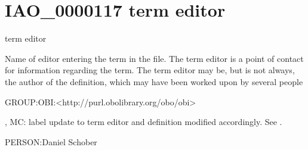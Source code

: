 \documentclass[letterpaper,10pt,english]{sphinxmanual}
\begin{document}
\section{IAO\_0000117 \sphinxhyphen{} term editor}
\label{\detokenize{doc-IAO_0000117:iao-0000117-term-editor}}\label{\detokenize{doc-IAO_0000117:index-0}}\label{\detokenize{doc-IAO_0000117::doc}}
\begin{sphinxShadowBox}

\sphinxAtStartPar
term editor
\end{sphinxShadowBox}

\begin{sphinxShadowBox}

\sphinxAtStartPar
Name of editor entering the term in the file. The term editor is a point of contact for information regarding the term. The term editor may be, but is not always, the author of the definition, which may have been worked upon by several people
\end{sphinxShadowBox}

\begin{sphinxShadowBox}

\sphinxAtStartPar
GROUP:OBI:\textless{}http://purl.obolibrary.org/obo/obi\textgreater{}
\end{sphinxShadowBox}

\begin{sphinxShadowBox}

, MC: label update to term editor and definition modified accordingly. See .
\end{sphinxShadowBox}

\begin{sphinxShadowBox}

\sphinxAtStartPar
PERSON:Daniel Schober
\end{sphinxShadowBox}
\begin{quote}
\label{\detokenize{doc-IAO_0000118:iao-0000118}}\label{\detokenize{doc-IAO_0000118:alternative-term}}\label{\detokenize{doc-IAO_0000118:iao-0000118}}
\ignorespaces \end{quote}
\end{document}
